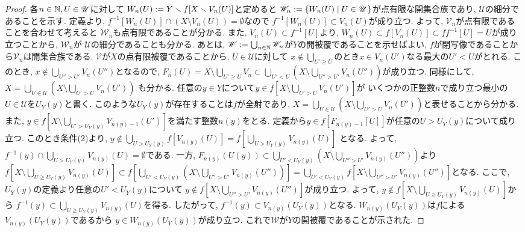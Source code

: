 \documentclass[uplatex, dvipdfmx, a4paper, 12pt, class=jsbook, crop=false]{standalone}
\begin{document}
\begin{proof}
	各$ n \in \mathbb{N}, U \in \mathscr{U} $に対して
	$ W_n(U) \mathrel{:=} Y \smallsetminus f[X \smallsetminus V_n(U)] $と定めると
	$ \mathscr{W}_n \defeq \setcomp{W_n(U)}{U \in \mathscr{U}} $が点有限な開集合族であり,
	$ \mathscr{U} $の細分であることを示す.
	定義より, $ f^{-1}[W_n(U)] \cap (X \setminus V_n(U)) = \emptyset $なので
	$ f^{-1}[W_n(U)] \subset V_n(U) $が成り立つ. よって, $ \mathscr{V}_n $が点有限であることを合わせて考えると
	$ \mathscr{W}_n $も点有限であることが分かる. また, $ V_n(U) \subset f^{-1}[U] $より,
	$ W_n(U) \subset f[V_n(U)] \subset ff^{-1}[U] = U $が成り立つことから, $ \mathscr{W}_n $が
	$ \mathscr{U} $の細分であることも分かる.
	あとは, $ \mathscr{W} \mathrel{:=} \bigcup_{n \in \mathbb{N}} \mathscr{W}_n $が$ Y $の開被覆であることを示せばよい.
	$ f $が閉写像であることから$ \mathscr{V}_n $は開集合族である.
	$ \mathscr{V} $が$ X $の点有限被覆であることから, $ U \in \mathscr{U} $に対して
	$ x \notin \bigcup_{U'\geq U} $のとき$ x \in V_n(U') $なる最大の$ U' < U $がとれる.
	このとき, $ x \notin \bigcup_{U'' > U'} V_n(U'') $となるので,
	$ F_n(U) = X \setminus \bigcup_{U' \geq U} V_{n} 
	\subset \bigcup_{U' < U} \left(X \setminus \bigcup_{U'' > U'} V_n(U'') \right) $が成り立つ.
	同様にして, $ X = \bigcup_{U \in \mathscr{U}}\left(X \setminus \bigcup_{U' > U}V_n(U')\right) $
	も分かる. 任意の$ y \in Y $について$ y \in f[X \setminus \bigcup_{U' > U}V_n(U')] $が
	いくつかの正整数$ n $で成り立つ最小の$ U \in \mathscr{U} $を$ U_Y(y) $と書く. 
	このような$ U_Y(y) $が存在することは$ f $が全射であり, 
	$ X = \bigcup_{U \in \mathscr{U}}\left(X \setminus \bigcup_{U' > U}V_n(U')\right) $と表せることから分かる.
	また, $ y \in f[X \setminus \bigcup_{U' > U_Y(y)} V_{n(y)-1}(U')] $を満たす整数$ n(y) $をとる.
	定義から$ y \in f[F_{n(y)-1}[U]] $が任意の$ U > U_Y(y) $について成り立つ.
	このとき条件(2)より, $ y \notin \bigcup_{U > U_Y(y)} f[V_{n(y)}(U)] = f[\bigcup_{U > U_Y(y)} V_{n(y)}(U)] $
	となる. よって, $ f^{-1}(y) \cap \bigcup_{U > U_Y(y)} V_{n(y)}(U) = \emptyset $である.
	一方, $ F_{n(y)}(U(y)) \subset \bigcup_{U' < U_Y(y)} \left(X \setminus \bigcup_{U'' > U'} V_{n(y)}(U'') \right) $より
	$ f[X \setminus \bigcup_{U \geq U_Y(y)} V_{n(y)}(U)] 
	\subset f[\bigcup_{U' < U_Y(y)} \left(X \setminus \bigcup_{U'' > U'} V_{n(y)}(U'') \right)] 
	= \bigcup_{U' < U_Y(y)} f[X \setminus \bigcup_{U'' > U'} V_{n(y)}(U'')] $となる. 
	ここで, $ U_Y(y) $の定義より任意の$ U' < U_Y(y) $について
	$ y \notin f[X \setminus \bigcup_{U'' > U'} V_{n(y)}(U'')] $が成り立つ.
	よって, $ y \notin f[X \setminus \bigcup_{U \geq U_Y(y)} V_{n(y)}(U)] $から
	$ f^{-1}(y) \subset \bigcup_{U \geq U_Y(y)} V_{n(y)}(U) $を得る.
	したがって, $ f^{-1}(y) \subset V_{n(y)}(U_Y(y)) $となる.
	$ W_{n(y)}(U_Y(y)) $は$ f $による$ V_{n(y)}(U_Y(y)) $であるから
	$ y \in W_{n(y)}(U_Y(y)) $が成り立つ. これで$ \mathscr{W} $が$ Y $の開被覆であることが示された.
\end{proof}
\end{document}
